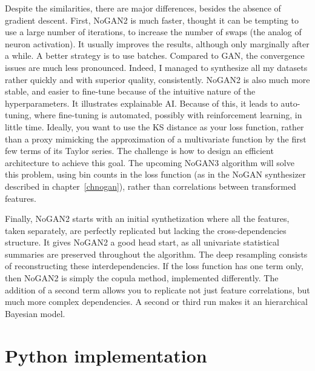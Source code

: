 \documentclass[oneside,10pt]{book}
\begin{document}
Despite the similarities, there are major differences, besides the absence of \textcolor{index}{gradient descent}. First, NoGAN2 is much faster, thought it can be tempting to use a large number of iterations, to increase the number of \textcolor{index}{swaps} (the analog of neuron \textcolor{index}{activation}). It usually improves the results, although only marginally after a while. A better strategy is to use batches. Compared to GAN, the convergence issues are much less pronounced. Indeed, I managed to synthesize all my datasets rather quickly and with superior quality, consistently. NoGAN2 is also much more stable, and easier to fine-tune because of the intuitive nature of the hyperparameters. It illustrates \textcolor{index}{explainable AI}. Because of this, it leads to
\textcolor{index}{auto-tuning}, where fine-tuning is automated, possibly with \textcolor{index}{reinforcement learning}, in little time. Ideally, you want to use the KS distance as your loss function, rather than a proxy mimicking
 the approximation of a multivariate function by the first few terms of its Taylor series. The challenge is how to design an efficient architecture to
 achieve this goal. The upcoming NoGAN3 algorithm will solve this problem, using bin counts in the loss function (as in the NoGAN synthesizer
 described in chapter~\ref{chnogan}), rather than correlations between transformed features.

Finally, NoGAN2 starts with an initial synthetization where all the features, taken separately, are perfectly replicated but lacking the cross-dependencies structure. It gives NoGAN2 a good head start, as all univariate statistical summaries are preserved throughout the algorithm. The deep resampling consists of reconstructing these interdependencies. If the loss function has one term only, then NoGAN2 is simply the
\textcolor{index}{copula method}, implemented differently. The addition of a second term allows you to replicate not just feature correlations, but much more complex dependencies. A second or third run makes it an \textcolor{index}{hierarchical Bayesian model}.



\section{Python implementation}\label{pyityhohg}
\end{document}
